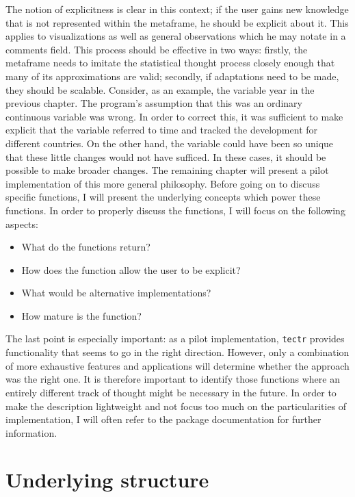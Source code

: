\documentclass[]{report}
\theoremstyle{definition}
\theoremstyle{definition}
\theoremstyle{definition}
\theoremstyle{remark}
\begin{document}
The notion of explicitness is clear in this context; if the user gains
new knowledge that is not represented within the metaframe, he should be
explicit about it. This applies to visualizations as well as general
observations which he may notate in a comments field. This process
should be effective in two ways: firstly, the metaframe needs to imitate
the statistical thought process closely enough that many of its
approximations are valid; secondly, if adaptations need to be made, they
should be scalable. Consider, as an example, the variable year in the
previous chapter. The program's assumption that this was an ordinary
continuous variable was wrong. In order to correct this, it was
sufficient to make explicit that the variable referred to time and
tracked the development for different countries. On the other hand, the
variable could have been so unique that these little changes would not
have sufficed. In these cases, it should be possible to make broader
changes. The remaining chapter will present a pilot implementation of
this more general philosophy. Before going on to discuss specific
functions, I will present the underlying concepts which power these
functions. In order to properly discuss the functions, I will focus on
the following aspects:

\begin{itemize}
\item
  What do the functions return?
\item
  How does the function allow the user to be explicit?
\item
  What would be alternative implementations?
\item
  How mature is the function?
\end{itemize}

The last point is especially important: as a pilot implementation,
\texttt{tectr} provides functionality that seems to go in the right
direction. However, only a combination of more exhaustive features and
applications will determine whether the approach was the right one. It
is therefore important to identify those functions where an entirely
different track of thought might be necessary in the future. In order to
make the description lightweight and not focus too much on the
particularities of implementation, I will often refer to the package
documentation for further information.

\section{Underlying structure}\label{underlying-structure}
\end{document}
